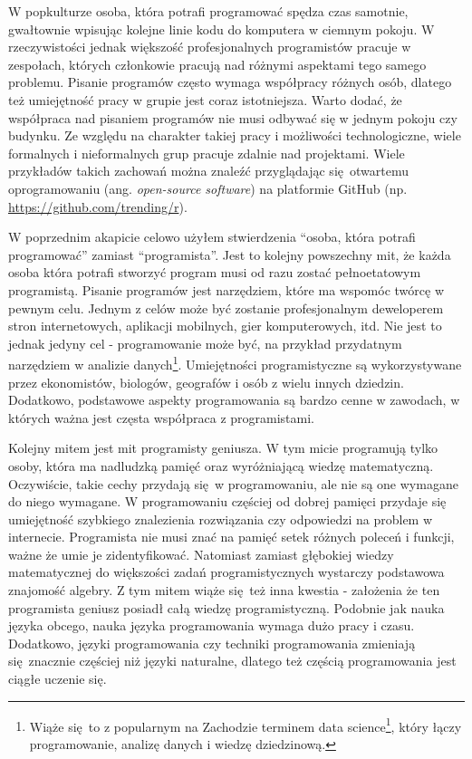\documentclass[paper=6in:9in,pagesize=pdftex,headinclude=on,footinclude=on,10pt]{scrbook}
\DeclareRobustCommand{\href}[2]{#2\footnote{\url{#1}}}
\begin{document}
W popkulturze osoba, która potrafi programować spędza czas samotnie, gwałtownie wpisując kolejne linie kodu do komputera w ciemnym pokoju.
W rzeczywistości jednak większość profesjonalnych programistów pracuje w zespołach, których członkowie pracują nad różnymi aspektami tego samego problemu.
Pisanie programów często wymaga współpracy różnych osób, dlatego też umiejętność pracy w grupie jest coraz istotniejsza.
Warto dodać, że współpraca nad pisaniem programów nie musi odbywać się w jednym pokoju czy budynku.
Ze względu na charakter takiej pracy i możliwości technologiczne, wiele formalnych i nieformalnych grup pracuje zdalnie nad projektami.
Wiele przykładów takich zachowań można znaleźć przyglądając się~otwartemu oprogramowaniu (ang. \emph{open-source software}) na platformie GitHub (np. \url{https://github.com/trending/r}).

W poprzednim akapicie celowo użyłem stwierdzenia ``osoba, która potrafi programować'' zamiast ``programista''.
Jest to kolejny powszechny mit, że każda osoba która potrafi stworzyć program musi od razu zostać pełnoetatowym programistą.
Pisanie programów jest narzędziem, które ma wspomóc twórcę w pewnym celu.
Jednym z celów może być zostanie profesjonalnym deweloperem stron internetowych, aplikacji mobilnych, gier komputerowych, itd.
Nie jest to jednak jedyny cel - programowanie może być, na przykład przydatnym narzędziem w analizie danych\footnote{Wiąże się~to z popularnym na Zachodzie terminem \href{https://en.wikipedia.org/wiki/Data_science}{data science}, który łączy programowanie, analizę danych i wiedzę dziedzinową.}.
Umiejętności programistyczne są wykorzystywane przez ekonomistów, biologów, geografów i osób z wielu innych dziedzin.
Dodatkowo, podstawowe aspekty programowania są bardzo cenne w zawodach, w których ważna jest częsta współpraca z programistami.

Kolejny mitem jest mit programisty geniusza.
W tym micie programują tylko osoby, która ma nadludzką pamięć oraz wyróżniającą wiedzę matematyczną.
Oczywiście, takie cechy przydają się~w programowaniu, ale nie są one wymagane do niego wymagane.
W programowaniu częściej od dobrej pamięci przydaje się umiejętność szybkiego znalezienia rozwiązania czy odpowiedzi na problem w internecie.
Programista nie musi znać na pamięć setek różnych poleceń i funkcji, ważne że umie je zidentyfikować.
Natomiast zamiast głębokiej wiedzy matematycznej do większości zadań programistycznych wystarczy podstawowa znajomość algebry.
Z tym mitem wiąże się~też inna kwestia - założenia że ten programista geniusz posiadł całą wiedzę programistyczną.
Podobnie jak nauka języka obcego, nauka języka programowania wymaga dużo pracy i czasu.
Dodatkowo, języki programowania czy techniki programowania zmieniają się~znacznie częściej niż języki naturalne, dlatego też częścią programowania jest ciągłe uczenie się.
\end{document}

